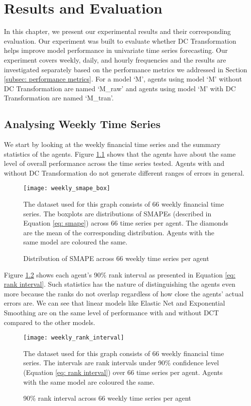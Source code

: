 \chapter{Results and Evaluation}\label{ch: results and eval}
In this chapter, we present our experimental results and their corresponding evaluation. Our experiment was built to evaluate whether DC Transformation helps improve model performance in univariate time series forecasting. Our experiment covers weekly, daily, and hourly frequencies and the results are investigated separately based on the performance metrics we addressed in Section \ref{subsec: performance metrics}. For a model `M', agents using model `M' without DC Transformation are named `M\_raw' and agents using model `M' with DC Transformation are named `M\_tran'.

\section{Analysing Weekly Time Series}
We start by looking at the weekly financial time series and the summary statistics of the agents. Figure \ref{fig: weekly smape box} shows that the agents have about the same level of overall performance across the time series tested. Agents with and without DC Transformation do not generate different ranges of errors in general.
\begin{figure}[H]
    \centering
    \texttt{[image: weekly\_smape\_box]}
    \caption{Distribution of SMAPE across $66$ weekly time series per agent}
    {\raggedright \footnotesize The dataset used for this graph consists of $66$ weekly financial time series. The boxplots are distributions of SMAPEs (described in Equation \ref{eq: smape}) across $66$ time series per agent. The diamonds are the mean of the corresponding distribution. Agents with the same model are coloured the same. \par}
    \label{fig: weekly smape box}
\end{figure}
Figure \ref{fig: weekly rank interval} shows each agent's 90\% rank interval as presented in Equation \ref{eq: rank interval}. Such statistics has the nature of distinguishing the agents even more because the ranks do not overlap regardless of how close the agents' actual errors are. We can see that linear models like Elastic Net and Exponential Smoothing are on the same level of performance with and without DCT compared to the other models.
\begin{figure}[H]
    \centering
    \texttt{[image: weekly\_rank\_interval]}
    \caption{90\% rank interval across $66$ weekly time series per agent}
    {\raggedright \footnotesize The dataset used for this graph consists of $66$ weekly financial time series. The intervals are rank intervals under 90\% confidence level (Equation \ref{eq: rank interval}) over $66$ time series per agent. Agents with the same model are coloured the same. \par}
    \label{fig: weekly rank interval}
\end{figure}
